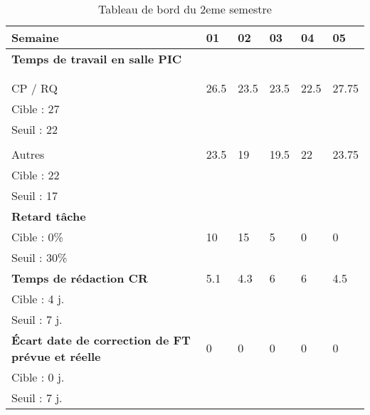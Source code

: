 \documentclass[asi,sansVersion]{picInsa}
\begin{document}
	\newpage
	\begin{landscape}
	\begin{center}
		\LARGE
		\textsc{
			\TB{}\\
		}
	\end{center}
	\vspace{0.5cm}


		\begin{longtable}{|p{2.2cm}|p{1cm}|p{1cm}|p{1cm}|p{1cm}|p{1cm}|}
		\caption{Tableau de bord du 2eme semestre}\\\hline
			\hline
			\rowcolor[gray]{0.85}
			Semaine & 01 & 02 & 03 & 04 & 05\\\hline
			\footnotesize
			\textbf{Temps de travail en salle PIC} & & & & &\\ 
			& & & & &\\
			& & & & &\\
			CP / RQ & 26.5 & 23.5 & 23.5 & 22.5 & 27.75 \\
			Cible : 27 & & & & &\\
			Seuil : 22 & & & & &\\
			& & & & &\\
			Autres  & 23.5 & 19 & 19.5 & 22 & 23.75\\
			Cible : 22  & & & & &\\
			Seuil : 17 & & & & &\\\hline
			\footnotesize
			\textbf{Retard tâche} & & & & &\\
			Cible : 0\% & 10 & 15 & 5 & 0 & 0\\
			Seuil : 30\% & & & & &\\\hline
			\textbf{Temps de rédaction CR} & 5.1 & 4.3 & 6 & 6 & 4.5\\
			Cible : 4 j. & & & & &\\
			Seuil : 7 j. & & & & &\\\hline
			\footnotesize
			\textbf{Écart date de correction de FT prévue et réelle} & 0 & 0 & 0 & 0 & 0\\
			Cible : 0 j. & & & & &\\
			Seuil : 7 j. & & & & &\\\hline
			
		\end{longtable}
	\end{landscape}
\end{document}

